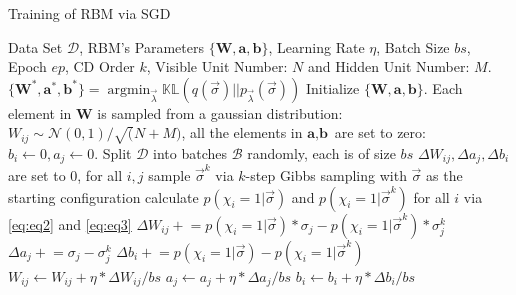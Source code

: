 \documentclass[letterpaper, 10pt]{article}
\begin{document}
\vskip 1cm
\begin{algorithm}[htb]
	\caption{Training of RBM via SGD}\label{al:rbm}
	\begin{algorithmic}[1]
		\Require Data Set $ \mathcal{D} $, RBM's Parameters $ \{\textbf{W}, \textbf{a}, \textbf{b}\} $, 
			Learning Rate $ \eta $, Batch Size $ bs $, Epoch $ ep $, CD Order $ k $, Visible Unit Number: 
			$ N $ and Hidden Unit Number: $M$.
		\Ensure $ \{\textbf{W}^*, \textbf{a}^*, \textbf{b}^*\} = 
			\mathop{\arg\min}_{\vec{\lambda}} \mathbb{KL}(q(\vec{\sigma})||p_{\vec{\lambda}}(\vec{\sigma})) $
		\State Initialize $ \{\textbf{W}, \textbf{a}, \textbf{b}\} $. 
			Each element in $ \textbf{W} $ is sampled from a gaussian distribution: 
			$ W_{ij} \sim \mathcal{N}(0,1)/\sqrt(N+M) $, 
			all the elements in $ \textbf{a}, \textbf{b} $ are set to zero: $ b_i \leftarrow 0, a_j \leftarrow 0 $.
		\State Split $ \mathcal{D} $ into batches $ \mathcal{B} $ randomly, each is of size $ bs $
				\State $ \Delta W_{ij}, \Delta a_j, \Delta b_i $ are set to 0, for all $ i, j $
					\State sample $ \vec{\sigma}^k $ via $ k $-step Gibbs sampling 
						with $ \vec{\sigma} $ as the starting configuration
					\State calculate $ p(\chi_i=1|\vec{\sigma}) $ and $ p(\chi_i=1|\vec{\sigma}^k) $ 
						for all $ i $ via \ref{eq:eq2} and \ref{eq:eq3}
					\State $ \Delta W_{ij} +\!\!= p(\chi_i=1|\vec{\sigma})*\sigma_j - 
						p(\chi_i=1|\vec{\sigma}^k)*\sigma^k_j $
					\State $ \Delta a_j +\!\!= \sigma_j - \sigma_j^k $
					\State $ \Delta b_i +\!\!= p(\chi_i=1|\vec{\sigma}) - p(\chi_i=1|\vec{\sigma}^k) $
				\EndFor
				\State $ W_{ij} \leftarrow W_{ij} + \eta * \Delta W_{ij} / bs $
				\State $ a_j \leftarrow a_j + \eta * \Delta a_j / bs $
				\State $ b_i \leftarrow b_i + \eta * \Delta b_i / bs $
			\EndFor
		\EndFor
	\end{algorithmic}
\end{algorithm}
\end{document}
